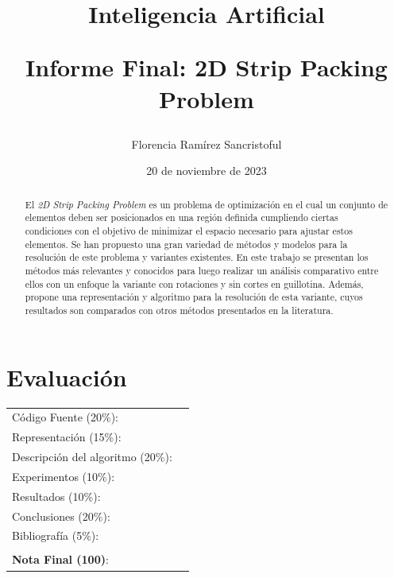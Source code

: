 \documentclass[letter, 10pt]{article}
\begin{document}
\title{Inteligencia Artificial \\ \begin{Large}Informe Final: 2D Strip Packing Problem\end{Large}}
\author{Florencia Ram\'irez Sancristoful}
\date{20 de noviembre de 2023}
\maketitle


\section*{Evaluaci\'on}

\begin{tabular}{ll}
C\'odigo Fuente (20\%): &  \underline{\hspace{2cm}}\\
Representaci\'on (15\%):  & \underline{\hspace{2cm}} \\
Descripci\'on del algoritmo (20\%):  & \underline{\hspace{2cm}} \\
Experimentos (10\%):  & \underline{\hspace{2cm}} \\
Resultados (10\%):  & \underline{\hspace{2cm}} \\
Conclusiones (20\%): &  \underline{\hspace{2cm}}\\
Bibliograf\'ia (5\%): & \underline{\hspace{2cm}}\\
 &  \\
\textbf{Nota Final (100)}:   & \underline{\hspace{2cm}}
\end{tabular}

\vspace{0.6cm}


\begin{abstract}   
    El \emph{2D Strip Packing Problem} es un problema de optimizaci\'on en el cual un conjunto de elementos deben ser posicionados en una regi\'on definida cumpliendo ciertas condiciones con el objetivo de minimizar el espacio necesario para ajustar estos elementos. Se han propuesto una gran variedad de m\'etodos y modelos para la resoluci\'on de este problema y variantes existentes. En este trabajo se presentan los m\'etodos m\'as relevantes y conocidos para luego realizar un an\'alisis comparativo entre ellos con un enfoque la variante con rotaciones y sin cortes en guillotina. Adem\'as, propone una representaci\'on y algoritmo para la resoluci\'on de esta variante, cuyos resultados son comparados con otros m\'etodos presentados en la literatura.

\end{abstract}
\end{document}
